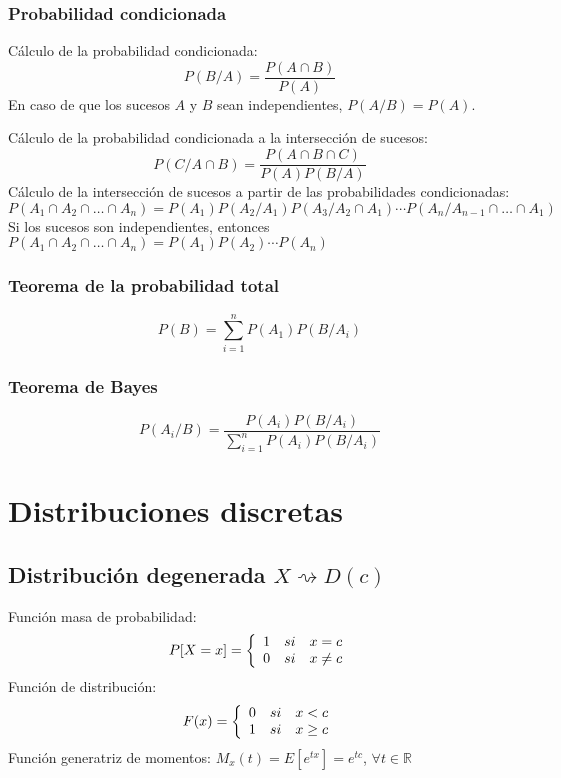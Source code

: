 \documentclass[11pt,twoside,titlepage,a4paper]{article}
\theoremstyle{definition}
\theoremstyle{plain_rojo}
\theoremstyle{remark}
\begin{document}
\subsubsection*{Probabilidad condicionada}

Cálculo de la probabilidad condicionada:
$$P(B/A)=\displaystyle\frac{P(A\cap B)}{P(A)}$$
En caso de que los sucesos $A$ y $B$ sean independientes, $P(A/B)=P(A)$.

Cálculo de la probabilidad condicionada a la intersección de sucesos:
$$P(C/A\cap B)=\displaystyle\frac{P(A\cap B\cap C)}{P(A)P(B/A)}$$
Cálculo de la intersección de sucesos a partir de las probabilidades condicionadas:
$$P(A_1\cap A_2\cap\ldots\cap A_n)=P(A_1)P(A_2/A_1)P(A_3/A_2\cap A_1)\cdots P(A_n/A_{n-1}\cap\ldots\cap A_1)$$
Si los sucesos son independientes, entonces $P(A_1\cap A_2\cap\ldots\cap A_n)=P(A_1)P(A_2)\cdots P(A_n)$

\subsubsection*{Teorema de la probabilidad total}

$$P(B)=\displaystyle\sum_{i=1}^{n}P(A_1)P(B/A_i)$$

\subsubsection*{Teorema de Bayes}

$$P(A_i/B)=\displaystyle\frac{P(A_i)P(B/A_i)}{\sum_{i=1}^{n}P(A_i)P(B/A_i)}$$


\newpage
\section{Distribuciones discretas}

\subsection{Distribución degenerada $X\rightsquigarrow D(c)$}

Función masa de probabilidad:
\begin{equation*}
P[X=x]=\left\{
	\begin{array}{l c l}
	1 & si & x=c \\
	0 & si & x\neq c
	\end{array}
\right.
\end{equation*}
Función de distribución:
\begin{equation*}
F(x)=\left\{
	\begin{array}{l c l}
	0 & si & x<c \\
	1 & si & x\geq c
	\end{array}
\right.
\end{equation*}
Función generatriz de momentos: $M_x(t)=E[e^{tx}]=e^{tc}$, $\forall t\in\mathbb{R}$
\end{document}

